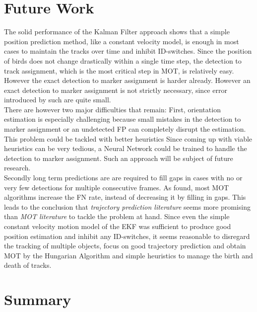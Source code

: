\documentclass{article}
\begin{document}
\section{Future Work}
The solid performance of the Kalman Filter approach shows that a simple position prediction method, like a constant velocity model, is enough in most cases to maintain the tracks over time and inhibit ID-switches. Since the position of birds does not change drastically within a single time step, the detection to track assignment, which is the most critical step in MOT, is relatively easy. However the exact detection to marker assignment is harder already. However an exact detection to marker assignment is not strictly necessary, since error introduced by such are quite small. \\
There are however two major difficulties that remain:
First, orientation estimation is especially challenging because small mistakes in the detection to marker assignment or an undetected FP can completely disrupt the estimation. This problem could be tackled with better heuristics Since coming up with viable heuristics can be very tedious, a Neural Network could be trained to handle the detection to marker assignment. Such an approach will be subject of future research.\\
Secondly long term predictions are are required to fill gaps in cases with no or very few detections for multiple consecutive frames. As \cite{tracking_the_trackers} found, most MOT algorithms increase the FN rate, instead of decreasing it by filling in gaps. This leads to the conclusion that \emph{trajectory prediction literature} seems more promising than \emph{MOT literature} to tackle the problem at hand. Since even the simple constant velocity motion model of the EKF was sufficient to produce good position estimation and inhibit any ID-switches, it seems reasonable to disregard the tracking of multiple objects, focus on good trajectory prediction and obtain MOT by the Hungarian Algorithm and simple heuristics to manage the birth and death of tracks.

\section{Summary}
\end{document}
